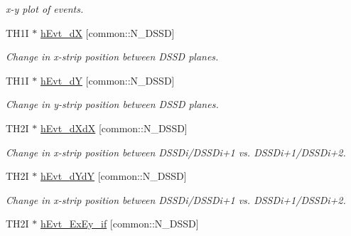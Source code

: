 \begin{DoxyCompactItemize}
\begin{DoxyCompactList}\small\item\em x-\/y plot of events. \end{DoxyCompactList}\item 
\hypertarget{classAnalysis_aaeb353fff859cc737ddcad5df80c6f62}{T\-H1\-I $\ast$ \hyperlink{classAnalysis_aaeb353fff859cc737ddcad5df80c6f62}{h\-Evt\-\_\-d\-X} \mbox{[}common\-::\-N\-\_\-\-D\-S\-S\-D\mbox{]}}\label{classAnalysis_aaeb353fff859cc737ddcad5df80c6f62}

\begin{DoxyCompactList}\small\item\em Change in x-\/strip position between D\-S\-S\-D planes. \end{DoxyCompactList}\item 
\hypertarget{classAnalysis_a85547ed6b87e7ac830495fc643b0377b}{T\-H1\-I $\ast$ \hyperlink{classAnalysis_a85547ed6b87e7ac830495fc643b0377b}{h\-Evt\-\_\-d\-Y} \mbox{[}common\-::\-N\-\_\-\-D\-S\-S\-D\mbox{]}}\label{classAnalysis_a85547ed6b87e7ac830495fc643b0377b}

\begin{DoxyCompactList}\small\item\em Change in y-\/strip position between D\-S\-S\-D planes. \end{DoxyCompactList}\item 
\hypertarget{classAnalysis_ac7099a278a27890f157e82175b144062}{T\-H2\-I $\ast$ \hyperlink{classAnalysis_ac7099a278a27890f157e82175b144062}{h\-Evt\-\_\-d\-Xd\-X} \mbox{[}common\-::\-N\-\_\-\-D\-S\-S\-D\mbox{]}}\label{classAnalysis_ac7099a278a27890f157e82175b144062}

\begin{DoxyCompactList}\small\item\em Change in x-\/strip position between D\-S\-S\-Di/\-D\-S\-S\-Di+1 vs. D\-S\-S\-Di+1/\-D\-S\-S\-Di+2. \end{DoxyCompactList}\item 
\hypertarget{classAnalysis_a2d3f8b4774dd225b90df0d912bc36116}{T\-H2\-I $\ast$ \hyperlink{classAnalysis_a2d3f8b4774dd225b90df0d912bc36116}{h\-Evt\-\_\-d\-Yd\-Y} \mbox{[}common\-::\-N\-\_\-\-D\-S\-S\-D\mbox{]}}\label{classAnalysis_a2d3f8b4774dd225b90df0d912bc36116}

\begin{DoxyCompactList}\small\item\em Change in x-\/strip position between D\-S\-S\-Di/\-D\-S\-S\-Di+1 vs. D\-S\-S\-Di+1/\-D\-S\-S\-Di+2. \end{DoxyCompactList}\item 
\hypertarget{classAnalysis_a37e3b40d61bf17ddcc9753b986461215}{T\-H2\-I $\ast$ \hyperlink{classAnalysis_a37e3b40d61bf17ddcc9753b986461215}{h\-Evt\-\_\-\-Ex\-Ey\-\_\-if} \mbox{[}common\-::\-N\-\_\-\-D\-S\-S\-D\mbox{]}}\label{classAnalysis_a37e3b40d61bf17ddcc9753b986461215}


\end{DoxyCompactItemize}
